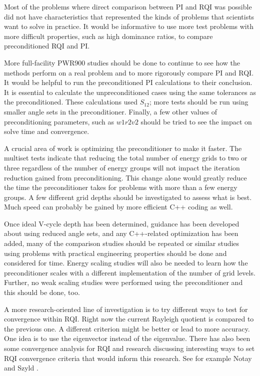 Most of the problems where direct comparison between PI and RQI was possible did not have characteristics that represented the kinds of problems that scientists want to solve in practice. It would be informative to use more test problems with more difficult properties, such as high dominance ratios, to compare preconditioned RQI and PI. 

More full-facility PWR900 studies should be done to continue to see how the methods perform on a real problem and to more rigorously compare PI and RQI. It would be helpful to run the preconditioned PI calculations to their conclusion. It is essential to calculate the unpreconditioned cases using the same tolerances as the preconditioned. These calculations used $S_{12}$; more tests should be run using smaller angle sets in the preconditioner. Finally, a few other values of preconditioning parameters, such as $w1r2v2$ should be tried to see the impact on solve time and convergence. 

A crucial area of work is optimizing the preconditioner to make it faster. The multiset tests indicate that reducing the total number of energy grids to two or three regardless of the number of energy groups will not impact the iteration reduction gained from preconditioning. This change alone would greatly reduce the time the preconditioner takes for problems with more than a few energy groups. A few different grid depths should be investigated to assess what is best. Much speed can probably be gained by more efficient C++ coding as well. 

Once ideal V-cycle depth has been determined, guidance has been developed about using reduced angle sets, and any C++-related optimization has been added, many of the comparison studies should be repeated or similar studies using problems with practical engineering properties should be done and considered for time. Energy scaling studies will also be needed to learn how the preconditioner scales with a different implementation of the number of grid levels. Further, no weak scaling studies were performed using the preconditioner and this should be done, too. 

A more research-oriented line of investigation is to try different ways to test for convergence within RQI. Right now the current Rayleigh quotient is compared to the previous one. A different criterion might be better or lead to more accuracy. One idea is to use the eigenvector instead of the eigenvalue. There has also been some convergence analysis for RQI and research discussing interesting ways to set RQI convergence criteria that would inform this research. See for example Notay \cite{Notay2003} and Szyld \cite{Szyld2011}.
    
